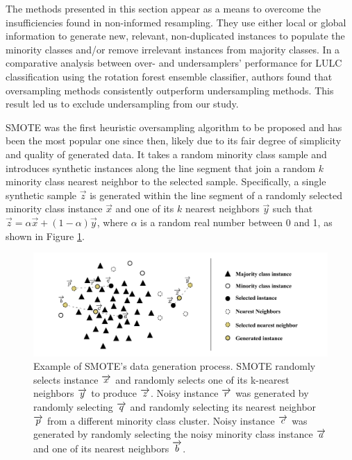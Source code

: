 \documentclass[information,article,submit,moreauthors,pdftex]{Definitions/mdpi}
\begin{document}
\begin{paracol}{2}
The methods presented in this section appear as a means to overcome the
insufficiencies found in non-informed resampling. They use either local or
global information to generate new, relevant, non-duplicated instances to
populate the minority classes and/or remove irrelevant instances from majority
classes. In a comparative analysis between over- and undersamplers' performance
for LULC classification \citep{Feng2018} using the rotation forest ensemble
classifier, authors found that oversampling methods consistently outperform
undersampling methods. This result led us to exclude undersampling from our
study.

SMOTE \citep{Chawla2002} was the first heuristic oversampling algorithm to be
proposed and has been the most popular one since then, likely due to its fair
degree of simplicity and quality of generated data. It takes a random minority
class sample and introduces synthetic instances along the line segment that
join a random $k$ minority class nearest neighbor to the selected sample.
Specifically, a single synthetic sample $\overrightarrow{z}$ is generated
within the line segment of a randomly selected minority class
instance $\overrightarrow{x}$ and one of its $k$ nearest
neighbors $\overrightarrow{y}$ such that $\overrightarrow{z} =
\alpha\overrightarrow{x}+(1-\alpha)\overrightarrow{y}$, where $\alpha$ is a
random real number between 0 and 1, as shown in
Figure \ref{fig:smote_example}.

\end{paracol}
\begin{figure}
	\centering
    \captionsetup{justification=centering}
    \caption{Example of SMOTE's data generation process. SMOTE randomly
        selects instance $\protect\overrightarrow{x}$ and randomly selects one
        of its k-nearest neighbors $\protect\overrightarrow{y}$ to produce
        $\protect\overrightarrow{z}$.  Noisy instance
        $\protect\overrightarrow{r}$ was generated by randomly selecting
        $\protect\overrightarrow{q}$ and randomly selecting its nearest
        neighbor $\protect\overrightarrow{p}$ from a different minority class
        cluster. Noisy instance $\protect\overrightarrow{c}$ was generated by
        randomly selecting the noisy minority class instance
        $\protect\overrightarrow{a}$ and one of its nearest neighbors
        $\protect\overrightarrow{b}$.
    \vspace{.2cm}}
	\label{fig:smote_example}
	\includegraphics[width=1\linewidth]{../analysis/smote_example}
\end{figure}
\end{document}
